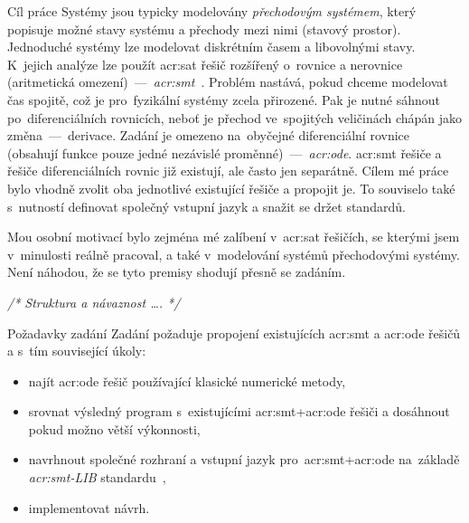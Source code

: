 \documentclass[thesis=M,czech]{FITthesis}[2012/06/26]
\newcommand{\acrlabel}[1]{acr:#1}
\newcommand{\acr}[1]{\acrshort{\acrlabel{#1}}}
\newcommand{\acrf}[1]{\acrfull{\acrlabel{#1}}}
\newcommand{\cmt}[1]{\textit{/* #1 */}}
\newcommand{\hl}[1]{\textit{#1}}
\newcommand{\name}[1]{\hl{#1}}
\newcommand{\cit}[1]{\cite{#1}}
\begin{document}
\begin{introduction}

\begin{section}{Cíl práce}\label{s:intro:goal}
Systémy jsou typicky modelovány \hl{přechodovým systémem},
který popisuje možné stavy systému a přechody mezi nimi
(stavový prostor).
Jednoduché systémy lze modelovat diskrétním časem a libovolnými stavy.
K~jejich analýze lze použít \acr{sat} řešič
rozšířený o~rovnice a nerovnice
(aritmetická omezení)~---~\name{\acrf{smt}}~\cit{smt}.
Problém nastává, pokud chceme modelovat čas spojitě,
což je pro~fyzikální systémy zcela přirozené.
Pak je nutné sáhnout po~diferenciálních rovnicích,
neboť je přechod ve~spojitých veličinách chápán
jako změna~---~derivace.
Zadání je omezeno na~obyčejné diferenciální rovnice
(obsahují funkce pouze jedné nezávislé proměnné)~---~\name{\acrf{ode}}.
\acr{smt} řešiče a řešiče diferenciálních rovnic
již existují, ale často jen separátně.
Cílem mé práce bylo vhodně zvolit
oba jednotlivé existující řešiče a propojit je.
To souviselo také s~nutností definovat
společný vstupní jazyk a snažit se držet standardů.

Mou osobní motivací bylo zejména mé zalíbení
v~\acr{sat} řešičích, se kterými jsem v~minulosti reálně pracoval,
a také v~modelování systémů přechodovými systémy.
Není náhodou, že se tyto premisy shodují přesně se zadáním.

\cmt{Struktura a návaznost \dots.}
\end{section} %


\begin{section}{Požadavky zadání}\label{s:intro:req}
Zadání požaduje propojení existujících \acr{smt} a \acr{ode} řešičů
a s~tím související úkoly:
\begin{itemize}
\item najít \acr{ode} řešič používající klasické numerické metody,
\item srovnat výsledný program s~existujícími
   \acr{smt}+\acr{ode} řešiči a dosáhnout pokud možno větší výkonnosti,
\item navrhnout společné rozhraní
   a vstupní jazyk pro~\acr{smt}+\acr{ode}
   na~základě \name{\acr{smt}-LIB} standardu~\cit{smtlib},
\item implementovat návrh.
\end{itemize}
\end{section} %


\end{introduction}
\end{document}
